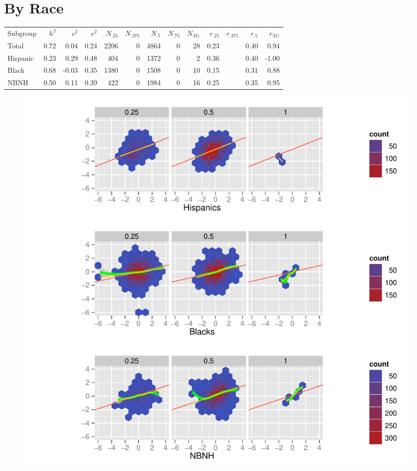 \documentclass[a4paper]{article}
\begin{document}
\newpage
\section{By Race}
\begin{table}[ht]
\begin{center}
\begin{tabular}{l|rrr|rrrrr|rrrr}
 Subgroup & $h^2$ & $c^2$ & $e^2$ & $N_{.25}$ & $N_{.375}$ & $N_{.5}$ & $N_{.75}$ & $N_{Mz}$ & $r_{.25}$ & $r_{.375}$ & $r_{.5}$ & $r_{Mz}$ \\ 
 Total & 0.72 & 0.04 & 0.24 & 2206 &   0 & 4864 &   0 &  28 & 0.23 &  & 0.40 & 0.94 \\ 
   \hline
Hispanic & 0.23 & 0.29 & 0.48 & 404 &   0 & 1372 &   0 &   2 & 0.36 &  & 0.40 & -1.00 \\ 
  Black & 0.68 & -0.03 & 0.35 & 1380 &   0 & 1508 &   0 &  10 & 0.15 &  & 0.31 & 0.88 \\ 
  NBNH & 0.50 & 0.11 & 0.39 & 422 &   0 & 1984 &   0 &  16 & 0.25 &  & 0.35 & 0.95 \\ 
  \end{tabular}
\end{center}
\end{table}\begin{figure}[htbp]
\includegraphics{Height-010}
\includegraphics{Height-011}
\includegraphics{Height-012}
\end{figure}
\end{document}
